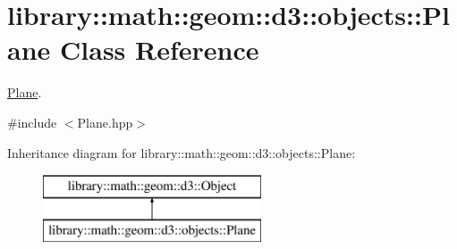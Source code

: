 \hypertarget{classlibrary_1_1math_1_1geom_1_1d3_1_1objects_1_1_plane}{}\section{library\+:\+:math\+:\+:geom\+:\+:d3\+:\+:objects\+:\+:Plane Class Reference}
\label{classlibrary_1_1math_1_1geom_1_1d3_1_1objects_1_1_plane}


\hyperlink{classlibrary_1_1math_1_1geom_1_1d3_1_1objects_1_1_plane}{Plane}.  




{\ttfamily \#include $<$Plane.\+hpp$>$}

Inheritance diagram for library\+:\+:math\+:\+:geom\+:\+:d3\+:\+:objects\+:\+:Plane\+:\begin{figure}[H]
\begin{center}
\leavevmode
\includegraphics[height=2.000000cm]{classlibrary_1_1math_1_1geom_1_1d3_1_1objects_1_1_plane}
\end{center}
\end{figure}
